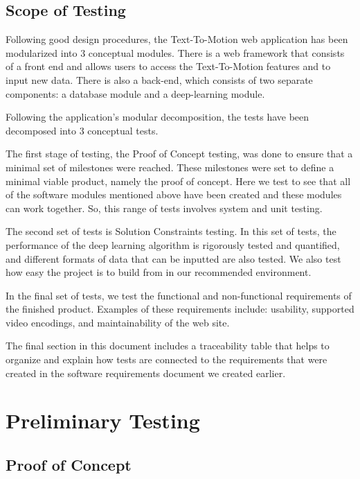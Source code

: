 \documentclass{scrreprt}
\begin{document}
\section{Scope of Testing}

Following good design procedures, the Text-To-Motion web application has been
modularized into $3$ conceptual modules.  There is a web framework that
consists of a front end and allows users to access the Text-To-Motion
features and to input new data.  There is also a back-end, which consists of two
separate components: a database module and a deep-learning module.

Following the application's modular decomposition, the tests have been
decomposed into $3$ conceptual tests.

The first stage of testing, the Proof of Concept testing, was done to ensure
that a minimal set of milestones were reached.  These milestones were set to
define a minimal viable product, namely the proof of concept.  Here we test to
see that all of the software modules mentioned above have been created and
these modules can work together.  So, this range of tests involves system and
unit testing.

The second set of tests is Solution Constraints testing.  In this set of
tests, the performance of the deep learning algorithm is rigorously tested
and quantified, and different formats of data that can be inputted are also
tested.  We also test how easy the project is to build from in our recommended
environment.

In the final set of tests, we test the functional and non-functional requirements
of the finished product. Examples of these requirements include: usability,
supported video encodings, and maintainability of the web site.

The final section in this document includes a traceability table that helps to
organize and explain how tests are connected to the requirements that were
created in the software requirements document we created earlier.

\chapter{Preliminary Testing}

\section{Proof of Concept}
\end{document}
